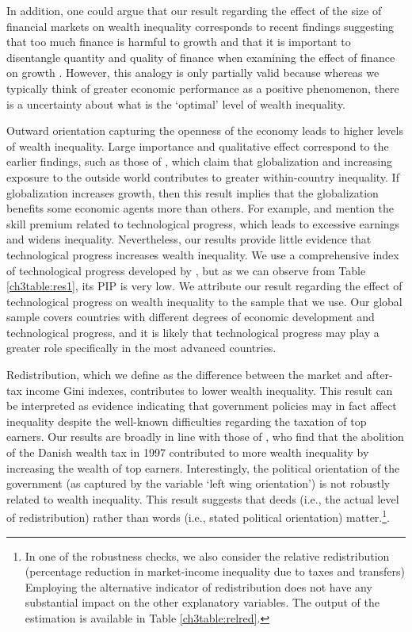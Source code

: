 \begin{refsection}
In addition, one could argue that our result regarding the effect of the size of financial markets on wealth inequality corresponds to recent findings suggesting that too much finance is harmful to growth \parencite{Arcandetal2012,CecchettiKharroubi2012,LawSingh2014} and that it is important to disentangle quantity and quality of finance when examining the effect of finance on growth \parencite{hasan2016}. However, this analogy is only partially valid because whereas we typically think of greater economic performance as a positive phenomenon, there is a uncertainty about what is the `optimal' level of wealth inequality. 

Outward orientation capturing the openness of the economy leads to higher levels of wealth inequality. Large importance and qualitative effect correspond to the earlier findings, such as those of \textcite{dabla2015causes}, which claim that globalization and increasing exposure to the outside world contributes to greater within-country inequality. If globalization increases growth, then this result implies that the globalization benefits some economic agents more than others. For example, \textcite{dabla2015causes} and \textcite{milanovic2016global} mention the skill premium related to technological progress, which leads to excessive earnings and widens inequality. Nevertheless, our results provide little evidence that technological progress increases wealth inequality. We use a comprehensive index of technological progress developed by \textcite{comin}, but as we can observe from Table \ref{ch3table:res1}, its \ac{PIP} is very low. We attribute our result regarding the effect of technological progress on wealth inequality to the sample that we use. Our global sample covers countries with different degrees of economic development and technological progress, and it is likely that technological progress may play a greater role specifically in the most advanced countries. 

Redistribution, which we define as the difference between the market and after-tax income Gini indexes, contributes to lower wealth inequality. This result can be interpreted as evidence indicating that government policies may in fact affect inequality despite the well-known difficulties regarding the taxation of top earners. Our results are broadly in line with those of \textcite{jakobsen2018}, who find that the abolition of the Danish wealth tax in 1997 contributed to more wealth inequality by increasing the wealth of top earners. Interestingly, the political orientation of the government (as captured by the variable `left wing orientation') is not robustly related to wealth inequality. This result suggests that deeds (i.e., the actual level of redistribution) rather than words (i.e., stated political orientation) matter.\footnote{In one of the robustness checks, we also consider the relative redistribution (percentage reduction in market-income inequality due to taxes and transfers) Employing the alternative indicator of redistribution does not have any substantial impact on the other explanatory variables. The output of the estimation is available in Table \ref{ch3table:relred}.}.


\end{refsection}
